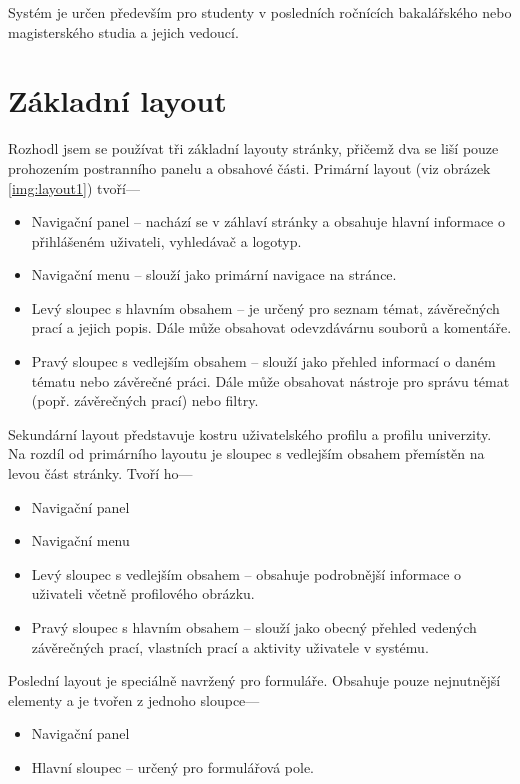 Systém je určen především pro studenty v posledních ročnících bakalářského nebo magisterského studia a jejich vedoucí.

\section{Základní layout}

Rozhodl jsem se používat tři základní layouty stránky, přičemž dva se liší pouze prohozením postranního panelu a obsahové části. Primární layout (viz obrázek \ref{img:layout1}) tvoří---

\begin{itemize}
    \item Navigační panel -- nachází se v záhlaví stránky a obsahuje hlavní informace o přihlášeném uživateli, vyhledávač a logotyp.
    \item Navigační menu -- slouží jako primární navigace na stránce.
    \item Levý sloupec s hlavním obsahem -- je určený pro seznam témat, závěrečných prací a jejich popis. Dále může obsahovat odevzdávárnu souborů a komentáře.
    \item Pravý sloupec s vedlejším obsahem -- slouží jako přehled informací o daném tématu nebo závěrečné práci. Dále může obsahovat nástroje pro správu témat (popř. závěrečných prací) nebo filtry.
\end{itemize}

Sekundární layout představuje kostru uživatelského profilu a profilu univerzity. Na rozdíl od primárního layoutu je sloupec s vedlejším obsahem přemístěn na levou část stránky. Tvoří ho---

\begin{itemize}
    \item Navigační panel
    \item Navigační menu
    \item Levý sloupec s vedlejším obsahem -- obsahuje podrobnější informace o uživateli včetně profilového obrázku.
    \item Pravý sloupec s hlavním obsahem -- slouží jako obecný přehled vedených závěrečných prací, vlastních prací a aktivity uživatele v systému.
\end{itemize}

Poslední layout je speciálně navržený pro formuláře. Obsahuje pouze nejnutnější elementy a je tvořen z jednoho sloupce---

\begin{itemize}
    \item Navigační panel
    \item Hlavní sloupec -- určený pro formulářová pole.
\end{itemize}

